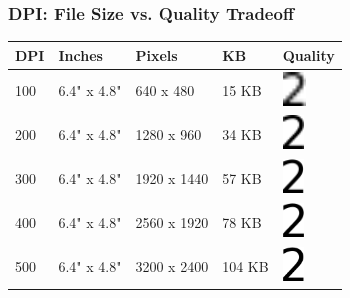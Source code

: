 \documentclass[xcolor={svgnames}]{beamer}
\begin{document}
\begin{frame}
    \frametitle{DPI: File Size vs. Quality Tradeoff}
    \vspace{1.5mm}
    \begin{tabular}{CCCCC}
        \toprule
        \textbf{DPI} & \textbf{Inches} & \textbf{Pixels} & \textbf{KB}
            & \textbf{Quality} \\
        \toprule

        100 & 6.4" x 4.8" &  640 x  480 &  15 KB  &
            \includegraphics[height=9mm]{img/digit-dpi-100.png} \\
            \midrule

        200 & 6.4" x 4.8" & 1280 x  960 &  34 KB  &
            \includegraphics[height=9mm]{img/digit-dpi-200.png} \\
            \midrule

        300 & 6.4" x 4.8" & 1920 x 1440 &  57 KB &
            \includegraphics[height=9mm]{img/digit-dpi-300.png} \\
            \midrule

        400 & 6.4" x 4.8" & 2560 x 1920 &  78 KB &
            \includegraphics[height=9mm]{img/digit-dpi-400.png} \\
            \midrule

        500 & 6.4" x 4.8" & 3200 x 2400 & 104 KB &
            \includegraphics[height=9mm]{img/digit-dpi-500.png} \\

        \bottomrule
    \end{tabular}
\end{frame}
\end{document}
